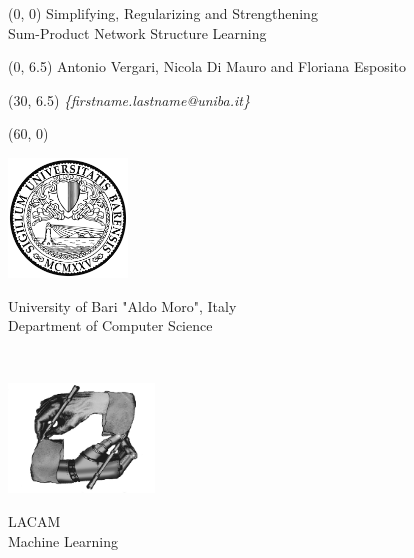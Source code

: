 \documentclass[final]{beamer}
\begin{document}
\begin{frame}{}
  \begin{textblock}{58}(0, 0)
    \huge
    Simplifying, Regularizing and Strengthening\\
    Sum-Product Network Structure Learning
  \end{textblock}
  \begin{textblock}{30}(0, 6.5)
    \small
    Antonio  Vergari, Nicola  {Di Mauro} and Floriana Esposito
  \end{textblock}
  \begin{textblock}{15}(30, 6.5)
    \small
    \emph{\{firstname.lastname@uniba.it\}}
  \end{textblock}
  \begin{textblock}{20}(60, 0)
    \scriptsize
    \begin{minipage}[t]{5cm}
      \vspace{0pt}\hspace{10pt}
      \includegraphics[width=90pt]{figures/unibaba}
    \end{minipage}
    \begin{minipage}[t]{12cm}
    \vspace{27pt}
      \flushleft
      University of Bari "Aldo Moro", Italy\\
    \vspace{2pt}
      Department of Computer Science
    \end{minipage}\\[0.75cm]
    \scriptsize
    \begin{minipage}[t]{5cm}
      \vspace{0pt}
      \includegraphics[width=110pt]{figures/lacam}
    \end{minipage}
    \begin{minipage}[t]{12cm}
      \vspace{23pt}
      \flushleft
      LACAM\\
      \vspace{2pt}
      Machine Learning
    \end{minipage}
  \end{textblock}
  

\end{frame}
\end{document}
